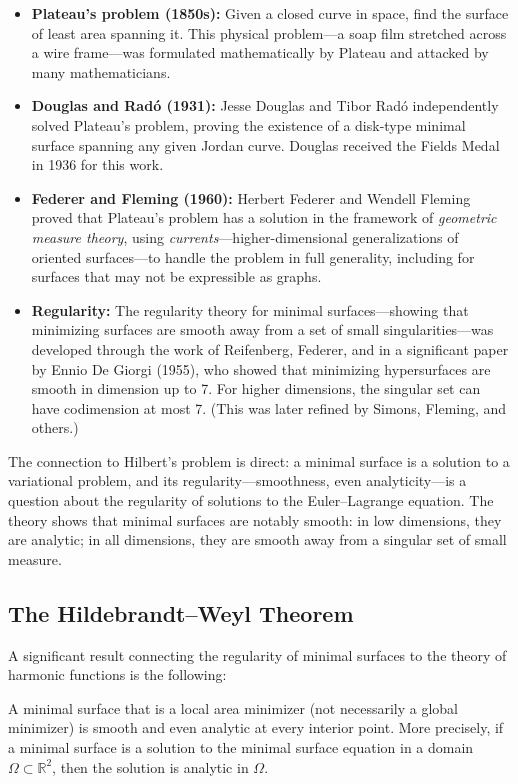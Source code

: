 \begin{itemize}
    \item \textbf{Plateau's problem (1850s):} Given a closed curve in space, find the surface of least area spanning it. This physical problem---a soap film stretched across a wire frame---was formulated mathematically by Plateau and attacked by many mathematicians.
    \item \textbf{Douglas and Rad\'o (1931):} Jesse Douglas and Tibor Rad\'o independently solved Plateau's problem, proving the existence of a disk-type minimal surface spanning any given Jordan curve. Douglas received the Fields Medal in 1936 for this work.
    \item \textbf{Federer and Fleming (1960):} Herbert Federer and Wendell Fleming proved that Plateau's problem has a solution in the framework of \emph{geometric measure theory}, using \emph{currents}---higher-dimensional generalizations of oriented surfaces---to handle the problem in full generality, including for surfaces that may not be expressible as graphs.
    \item \textbf{Regularity:} The regularity theory for minimal surfaces---showing that minimizing surfaces are smooth away from a set of small singularities---was developed through the work of Reifenberg, Federer, and in a significant paper by Ennio De Giorgi (1955), who showed that minimizing hypersurfaces are smooth in dimension up to 7. For higher dimensions, the singular set can have codimension at most 7. (This was later refined by Simons, Fleming, and others.)
\end{itemize}

The connection to Hilbert's problem is direct: a minimal surface is a solution to a variational problem, and its regularity---smoothness, even analyticity---is a question about the regularity of solutions to the Euler--Lagrange equation. The theory shows that minimal surfaces are notably smooth: in low dimensions, they are analytic; in all dimensions, they are smooth away from a singular set of small measure.

\subsection{The Hildebrandt--Weyl Theorem}

A significant result connecting the regularity of minimal surfaces to the theory of harmonic functions is the following:

\begin{theorem}\label{thm:hww}
A minimal surface that is a local area minimizer (not necessarily a global minimizer) is smooth and even analytic at every interior point. More precisely, if a minimal surface is a solution to the minimal surface equation in a domain $\Omega \subset \mathbb{R}^2$, then the solution is analytic in $\Omega$.
\end{theorem}

